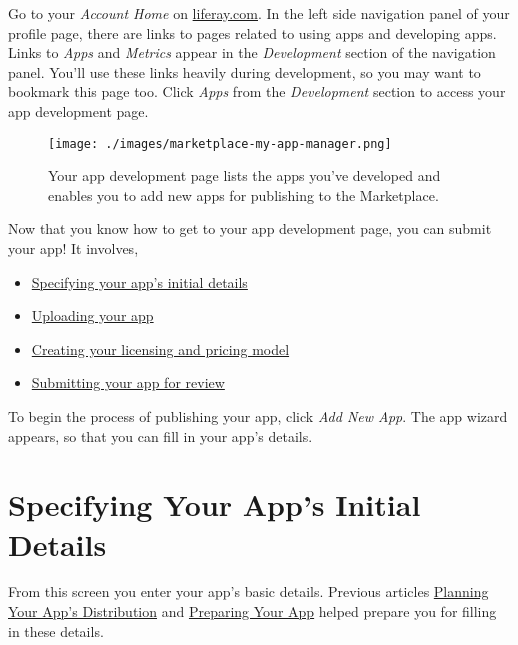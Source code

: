 Go to your \emph{Account Home} on
\href{http://www.liferay.com}{liferay.com}. In the left side navigation
panel of your profile page, there are links to pages related to using
apps and developing apps. Links to \emph{Apps} and \emph{Metrics} appear
in the \emph{Development} section of the navigation panel. You'll use
these links heavily during development, so you may want to bookmark this
page too. Click \emph{Apps} from the \emph{Development} section to
access your app development page.

\begin{figure}
\centering
\texttt{[image: ./images/marketplace-my-app-manager.png]}
\caption{Your app development page lists the apps you've developed and
enables you to add new apps for publishing to the Marketplace.}
\end{figure}

Now that you know how to get to your app development page, you can
submit your app! It involves,

\begin{itemize}
\tightlist
\item
  \href{/how-to-publish/-/knowledge_base/publish/specify-your-apps-initial-details}{Specifying
  your app's initial details}
\item
  \href{/how-to-publish/-/knowledge_base/publish/uploading-your-app}{Uploading
  your app}
\item
  \href{/how-to-publish/-/knowledge_base/publish/creating-your-licensing-and-pricing-model}{Creating
  your licensing and pricing model}
\item
  \href{/how-to-publish/-/knowledge_base/publish/submitting-your-app-for-review}{Submitting
  your app for review}
\end{itemize}

To begin the process of publishing your app, click \emph{Add New App}.
The app wizard appears, so that you can fill in your app's details.

\section{Specifying Your App's Initial
Details}\label{specifying-your-apps-initial-details}

From this screen you enter your app's basic details. Previous articles
\href{/how-to-publish/-/knowledge_base/publish/planning-your-apps-distribution}{Planning
Your App's Distribution} and
\href{/how-to-publish/-/knowledge_base/publish/preparing-your-app}{Preparing
Your App} helped prepare you for filling in these details.


